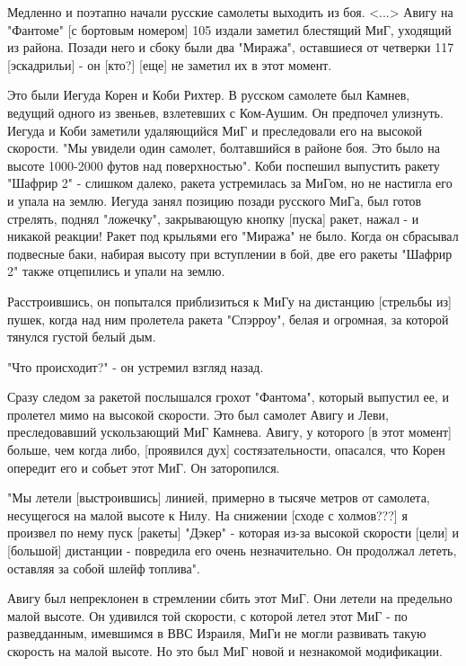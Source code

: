 \begin{textcitation}
	Медленно и поэтапно начали русские самолеты выходить из боя. <...> Авигу на "Фантоме" [с бортовым номером] 105 издали заметил блестящий МиГ, уходящий из района. Позади него и сбоку были два "Миража", оставшиеся от четверки 117 [эскадрильи] - он [кто?] [еще] не заметил их в этот момент.
	
	Это были Иегуда Корен и Коби Рихтер. В русском самолете был Камнев, ведущий одного из звеньев, взлетевших с Ком-Аушим. Он предпочел улизнуть. Иегуда и Коби заметили удаляющийся МиГ и преследовали его на высокой скорости. "Мы увидели один самолет, болтавшийся в районе боя. Это было на высоте 1000-2000 футов над поверхностью". Коби поспешил выпустить ракету "Шафрир 2" - слишком далеко, ракета устремилась за МиГом, но не настигла его и упала на землю. Иегуда занял позицию позади русского МиГа, был готов стрелять, поднял "ложечку", закрывающую кнопку [пуска] ракет, нажал - и никакой реакции! Ракет под крыльями его "Миража" не было. Когда он сбрасывал подвесные баки, набирая высоту при вступлении в бой, две его ракеты "Шафрир 2" также отцепились и упали на землю.
	
	Расстроившись, он попытался приблизиться к МиГу на дистанцию [стрельбы из] пушек, когда над ним пролетела ракета "Спэрроу", белая и огромная, за которой тянулся густой белый дым.
	
	"Что происходит?" - он устремил взгляд назад.
	
	Сразу следом за ракетой послышался грохот "Фантома", который выпустил ее, и пролетел мимо на высокой скорости. Это был самолет Авигу и Леви, преследовавший ускользающий МиГ Камнева. Авигу, у которого [в этот момент] больше, чем когда либо, [проявился дух] состязательности, опасался, что Корен опередит его и собьет этот МиГ. Он заторопился.
	
	"Мы летели [выстроившись] линией, примерно в тысяче метров от самолета, несущегося на малой высоте к Нилу. На снижении [сходе с холмов???] я произвел по нему пуск [ракеты] "Дэкер" - которая из-за высокой скорости [цели] и [большой] дистанции - повредила его очень незначительно. Он продолжал лететь, оставляя за собой шлейф топлива".
	
	Авигу был непреклонен в стремлении сбить этот МиГ. Они летели на предельно малой высоте. Он удивился той скорости, с которой летел этот МиГ - по разведданным, имевшимся в ВВС Израиля, МиГи не могли развивать такую скорость на малой высоте. Но это был МиГ новой и незнакомой модификации.
	

\end{textcitation}
